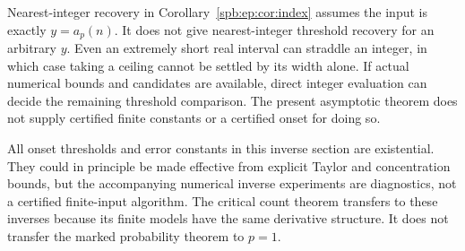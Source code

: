 \begin{remark}
Nearest-integer recovery in Corollary~\ref{spb:ep:cor:index} assumes the input
is exactly $y=a_p(n)$. It does not give nearest-integer threshold recovery
for an arbitrary $y$. Even an extremely short real interval can straddle
an integer, in which case taking a ceiling cannot be settled by its width
alone. If actual numerical bounds and candidates are available, direct
integer evaluation can decide the remaining threshold comparison.
The present asymptotic theorem does not supply certified finite constants
or a certified onset for doing so.
\end{remark}

All onset thresholds and error constants in this inverse section are
existential. They could in principle be made effective from explicit
Taylor and concentration bounds, but the accompanying numerical inverse
experiments are diagnostics, not a certified finite-input algorithm.
The critical count theorem transfers to these inverses because its finite
models have the same derivative structure. It does not transfer the marked
probability theorem to $p=1$.

